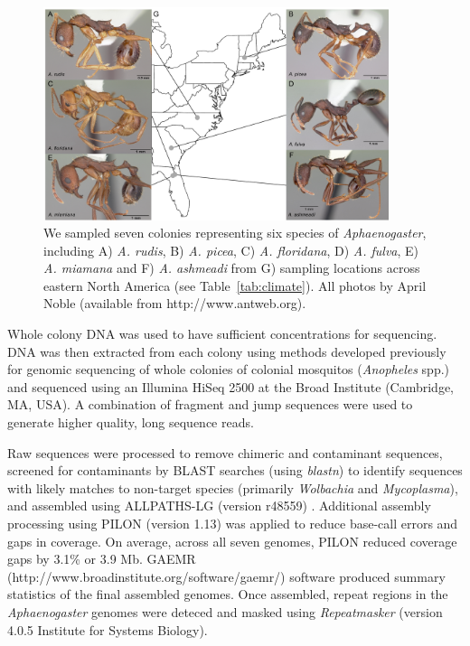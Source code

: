 \documentclass[fleqn,10pt,lineno]{wlpeerj} %
\begin{document}
\begin{figure}[ht]
\includegraphics[width = 0.9\textwidth]{fig2.pdf}
\caption{We sampled seven colonies representing six species of
  \textit{Aphaenogaster}, including A) \textit{A. rudis}, B)
  \textit{A. picea}, C) \textit{A. floridana}, D) \textit{A. fulva},
  E) \textit{A. miamana} and F) \textit{A. ashmeadi} from G) sampling
  locations across eastern North America (see
  Table~\ref{tab:climate}). All photos by April Noble (available from
  http://www.antweb.org).}
\label{fig:sampling}
\end{figure}

Whole colony DNA was used to have sufficient concentrations for
sequencing. DNA was then extracted from each colony using methods
developed previously for genomic sequencing of whole colonies of
colonial mosquitos (\textit{Anopheles} spp.)  \citep{Neafsey2010} and
sequenced using an Illumina HiSeq 2500 at the Broad Institute
(Cambridge, MA, USA). A combination of fragment and jump sequences
were used to generate higher quality, long sequence reads. 

Raw sequences were processed to remove chimeric and contaminant
sequences, screened for contaminants by BLAST searches (using
\textit{blastn}) to identify sequences with likely matches to
non-target species (primarily \textit{Wolbachia} and
\textit{Mycoplasma}), and assembled using ALLPATHS-LG (version r48559)
\citep{Gnerre2011}. Additional assembly processing using PILON
(version 1.13) \citep{Walker2014} was applied to reduce base-call
errors and gaps in coverage. On average, across all seven genomes,
PILON reduced coverage gaps by 3.1\% or 3.9 Mb. GAEMR
(http://www.broadinstitute.org/software/gaemr/) software produced
summary statistics of the final assembled genomes. Once assembled,
repeat regions in the \emph{Aphaenogaster} genomes were deteced and
masked using \textit{Repeatmasker} (version 4.0.5 Institute for
Systems Biology).
\end{document}
